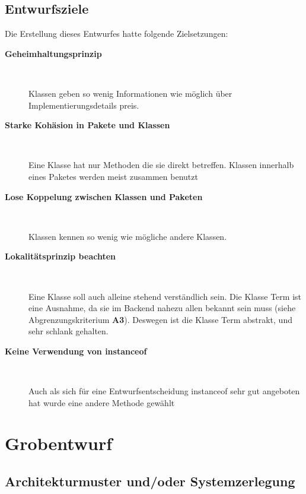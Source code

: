 \documentclass[parskip=full,11pt,twoside]{scrbook}
\begin{document}
\subsection{Entwurfsziele}
Die Erstellung dieses Entwurfes hatte folgende Zielsetzungen:
\begin{description}
	
		\item[\textbf{Geheimhaltungsprinzip}] ~\par
			Klassen geben so wenig Informationen wie möglich über Implementierungsdetails preis.
			
		\item[\textbf{Starke Kohäsion in Pakete und Klassen}] ~\par
			Eine Klasse hat nur Methoden die sie direkt betreffen. Klassen innerhalb eines Paketes werden meist zusammen benutzt
			
		\item[\textbf{Lose Koppelung zwischen Klassen und Paketen}]~\par
			Klassen kennen so wenig wie mögliche andere Klassen.
			
		\item[\textbf{Lokalitätsprinzip beachten}] ~\par
			Eine Klasse soll auch alleine stehend verständlich sein. Die Klasse Term ist eine Ausnahme, da sie im Backend nahezu allen bekannt sein muss (siehe Abgrenzungskriterium \textbf{A3}). Deswegen ist die Klasse Term abstrakt, und sehr schlank gehalten.
			
		\item[\textbf{Keine Verwendung von instanceof}] ~\par
			Auch als sich für eine  Entwurfsentscheidung instanceof sehr gut angeboten hat wurde eine andere Methode gewählt 
	
\end{description}
\pagebreak

\section{Grobentwurf}
\subsection{Architekturmuster und/oder Systemzerlegung}
\end{document}
